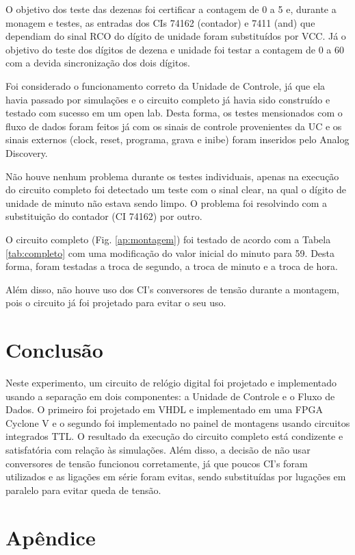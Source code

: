 \documentclass[a4,12pt]{horizon-theme}
\begin{document}
O objetivo dos teste das dezenas foi certificar a contagem de 0 a 5 e, durante a monagem e testes, as entradas dos CIs 74162 (contador) e 7411 (and) que dependiam do sinal RCO do dígito de unidade foram substituídos por VCC. Já o objetivo do teste dos dígitos de dezena e unidade foi testar a contagem de 0 a 60 com a devida sincronização dos dois dígitos.

Foi considerado o funcionamento correto da Unidade de Controle, já que ela havia passado por simulações e o circuito completo já havia sido construído e testado com sucesso em um open lab. Desta forma, os testes mensionados com o fluxo de dados foram feitos já com os sinais de controle provenientes da UC e os sinais externos (clock, reset, programa, grava e inibe) foram inseridos pelo Analog Discovery.

Não houve nenhum problema durante os testes individuais, apenas na execução do circuito completo foi detectado um teste com o sinal clear, na qual o dígito de unidade de minuto não estava sendo limpo. O problema foi resolvindo com a substituição do contador (CI 74162) por outro.

O circuito completo (Fig. \ref{ap:montagem}) foi testado de acordo com a Tabela \ref{tab:completo} com uma modificação do valor inicial do minuto para 59. Desta forma, foram testadas a troca de segundo, a troca de minuto e a troca de hora.

Além disso, não houve uso dos CI's conversores de tensão durante a montagem, pois o circuito já foi projetado para evitar o seu uso.


\section{Conclusão}
Neste experimento, um circuito de relógio digital foi projetado e implementado usando a separação em dois componentes: a Unidade de Controle e o Fluxo de Dados. O primeiro foi projetado em VHDL e implementado em uma FPGA Cyclone V e o segundo foi implementado no painel de montagens usando circuitos integrados TTL. O resultado da execução do circuito completo está condizente e satisfatória com relação às simulações. Além disso, a decisão de não usar conversores de tensão funcionou corretamente, já que poucos CI's foram utilizados e as ligações em série foram evitas, sendo substituídas por lugações em paralelo para evitar queda de tensão.

\clearpage
\newpage
\appendix
\section*{Apêndice}
\renewcommand{\thesubsection}{\Alph{subsection}}
\end{document}
